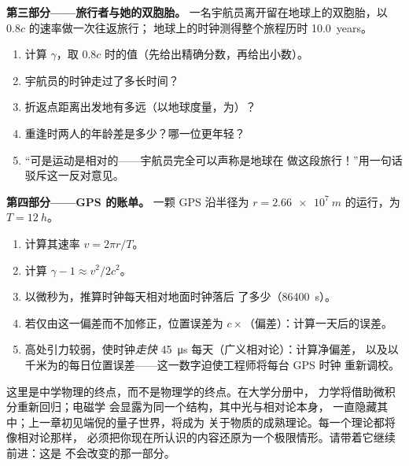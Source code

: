 \begin{problem}
\medskip
\noindent\textbf{第三部分——旅行者与她的双胞胎。}
一名宇航员离开留在地球上的双胞胎，以 $0.8c$ 的速率做一次往返旅行；
地球上的时钟测得整个旅程历时 \qty{10.0}{years}。
\begin{enumerate}[resume]
  \item 计算 $\gamma$，取 $0.8c$ 时的值（先给出精确分数，再给出小数）。
  \item 宇航员的时钟走过了多长时间？
  \item 折返点距离出发地有多远（以地球度量，为）？
  \item 重逢时两人的年龄差是多少？哪一位更年轻？
  \item “可是运动是相对的——宇航员完全可以声称是地球在
        做这段旅行！”用一句话驳斥这一反对意见。
\end{enumerate}

\medskip
\noindent\textbf{第四部分——GPS 的账单。}
一颗 GPS 沿半径为 $r = \qty{2.66e7}{m}$ 的运行，为 $T = \qty{12}{h}$。
\begin{enumerate}[resume]
  \item 计算其速率 $v = 2\pi r/T$。
  \item 计算 $\gamma - 1 \approx v^2/2c^2$。
  \item 以微秒为，推算时钟每天相对地面时钟落后
        了多少（\qty{86400}{s}）。
  \item 若仅由这一偏差而不加修正，位置误差为
        $c \times$（偏差）：计算一天后的误差。
  \item 高处引力较弱，使时钟\emph{走快}
        \qty{45}{\micro s} 每天（广义相对论）：计算净偏差，
        以及以千米为的每日位置误差——这一数字迫使工程师将每台 GPS 时钟
        重新调校。
\end{enumerate}
\end{problem}

\bigskip
\noindent
这里是中学物理的终点，而不是物理学的终点。在大学分册中，
力学将借助微积分重新回归；电磁学
会显露为同一个结构，其中光与相对论本身，
一直隐藏其中；上一章初见端倪的量子世界，将成为
关于物质的成熟理论。每一个理论都将像相对论那样，
必须把你现在所认识的内容还原为一个极限情形。请带着它继续前进：这是
不会改变的那一部分。

